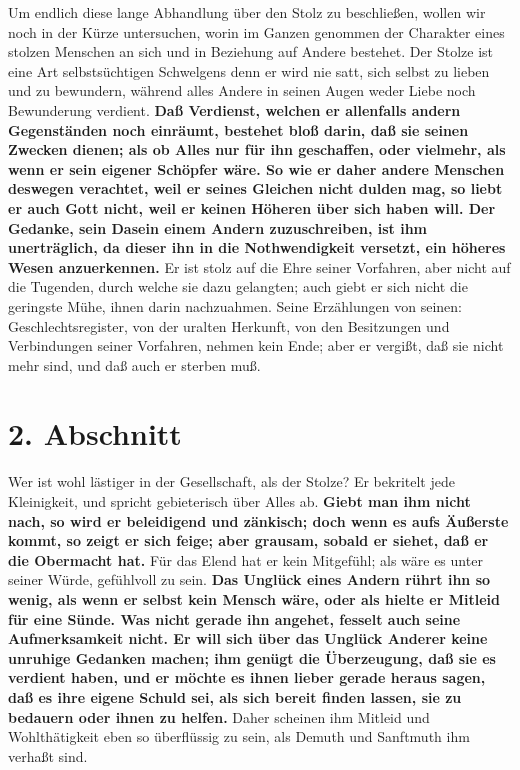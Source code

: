  Um endlich diese lange Abhandlung über den Stolz
zu beschließen, wollen wir noch
in der Kürze untersuchen, worin im Ganzen genommen der Charakter eines stolzen
Menschen an sich und in Beziehung auf Andere bestehet. Der Stolze ist eine Art
selbstsüchtigen Schwelgens denn er wird nie satt, sich selbst zu lieben und zu
bewundern, während alles Andere in seinen Augen weder Liebe noch Bewunderung
verdient.   \textbf{Daß Verdienst, welchen er allenfalls andern
Gegenständen noch
einräumt, bestehet bloß darin, daß sie seinen Zwecken dienen; als ob Alles nur
für ihn geschaffen, oder vielmehr, als wenn er sein eigener Schöpfer wäre. So
wie er daher andere Menschen deswegen verachtet, weil er seines Gleichen nicht
dulden mag, so liebt er auch Gott nicht, weil er keinen Höheren über sich haben
will. Der Gedanke, sein Dasein einem Andern zuzuschreiben, ist ihm unerträglich,
da dieser ihn in die Nothwendigkeit versetzt, ein höheres Wesen anzuerkennen.}
Er
ist stolz auf die Ehre seiner Vorfahren, aber nicht auf die Tugenden, durch
welche sie dazu gelangten; auch giebt er sich nicht die geringste Mühe, ihnen
darin nachzuahmen. Seine Erzählungen von seinen: Geschlechtsregister, von der
uralten Herkunft, von den Besitzungen und Verbindungen seiner Vorfahren, nehmen
kein Ende; aber er vergißt, daß sie nicht mehr sind, und daß auch er sterben
muß.

\section{2. Abschnitt} \label{kap12_ab2}

Wer ist wohl lästiger in der Gesellschaft, als der Stolze? Er bekritelt jede
Kleinigkeit, und spricht gebieterisch über Alles ab. \textbf{Giebt man ihm nicht
nach,
so wird er beleidigend und zänkisch; doch wenn es aufs Äußerste kommt, so zeigt
er sich feige; aber grausam, sobald er siehet, daß er die
Obermacht hat.} Für das
Elend hat er kein Mitgefühl; als wäre es unter seiner
Würde, gefühlvoll zu sein.
\textbf{Das Unglück eines Andern rührt ihn so wenig, als wenn er selbst kein
Mensch
wäre, oder als hielte er Mitleid für eine Sünde. Was nicht gerade
ihn angehet,
fesselt auch seine Aufmerksamkeit nicht. Er will sich über das Unglück Anderer
keine unruhige Gedanken machen; ihm genügt die  Überzeugung, daß sie es
verdient haben, und er möchte es ihnen lieber gerade heraus sagen, daß es ihre
eigene Schuld sei, als sich bereit finden lassen, sie zu bedauern
oder ihnen zu
helfen.} Daher scheinen ihm Mitleid und Wohlthätigkeit eben so
überflüssig zu
sein, als Demuth und Sanftmuth ihm verhaßt sind.

